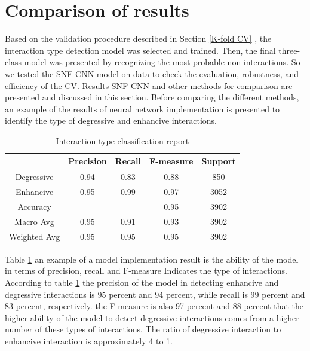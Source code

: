 \documentclass{bmcart}
\begin{document}
\section*{Comparison of results}
Based on the validation procedure described in Section
\ref{K-fold CV}
, the interaction type detection model was selected and trained. Then, the final three-class model was presented by recognizing the most probable non-interactions. So we tested the SNF-CNN model on data to check the evaluation, robustness, and efficiency of the CV. Results SNF-CNN and other methods for comparison are presented and discussed in this section. Before comparing the different methods, an example of the results of neural network implementation is presented to identify the type of degressive and enhancive interactions.

\begin{table}[h!]
\centering
\begin{tabular}{|c|c|c|c|c|}
\hline
& Precision & Recall & F-measure & Support \\
\hline
Degressive & 0.94 & 0.83 & 0.88 & 850 \\
\hline
Enhancive & 0.95 & 0.99 & 0.97 & 3052 \\
\hline
Accuracy &  & & 0.95 &3902\\
\hline
Macro Avg & 0.95 & 0.91 & 0.93 & 3902\\
\hline
Weighted Avg & 0.95 & 0.95 &0.95 & 3902\\
\hline
\end{tabular}
\newline
	\caption{Interaction type classification report}
	\label{classificatonReport}
\end{table}

Table
\ref{classificatonReport}
an example of a model implementation result is the ability of the model in terms of precision, recall and F-measure Indicates the type of interactions. According to table
\ref{classificatonReport}
the precision of the model in detecting enhancive and degressive interactions is 95 percent and 94 percent, while recall is 99 percent and 83 percent, respectively. the F-measure is also 97  percent and 88 percent that the higher ability of the model to detect degressive interactions comes from a higher number of these types of interactions. The ratio of degressive interaction to enhancive interaction is approximately 4 to 1.
\end{document}
